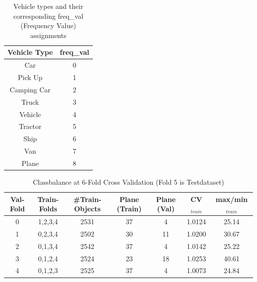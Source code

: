 \begin{table}[h!]
\centering
\begin{tabular}{c|c}
\hline
\textbf{Vehicle Type} & \textbf{freq\_val} \\
\hline
Car & 0 \\
Pick Up & 1 \\
Camping Car & 2 \\
Truck & 3 \\
Vehicle & 4 \\
Tractor & 5 \\
Ship & 6 \\
Van & 7 \\
Plane & 8 \\
\hline
\end{tabular}
\caption{Vehicle types and their corresponding freq\_val (Frequency Value) assignments}
\label{tab:class_freq_val}
\end{table}




\begin{table}[h!]
\centering

\begin{tabular}{c|c|c|c|c|c|c}
\hline
Val-Fold & Train-Folds & \#Train-Objects & Plane (Train) & Plane (Val) & CV$_{train}$ & max/min$_{train}$ \\
\hline
0 & 1,2,3,4 & 2531 & 37 & 4  & 1.0124 & 25.14 \\
1 & 0,2,3,4 & 2502 & 30 & 11 & 1.0200 & 30.67 \\
2 & 0,1,3,4 & 2542 & 37 & 4  & 1.0142 & 25.22 \\
3 & 0,1,2,4 & 2524 & 23 & 18 & 1.0253 & 40.61 \\
4 & 0,1,2,3 & 2525 & 37 & 4  & 1.0073 & 24.84 \\
\hline
\end{tabular}
\caption{Classbalance at 6-Fold Cross Validation (Fold 5 is Testdataset)}
\end{table}


